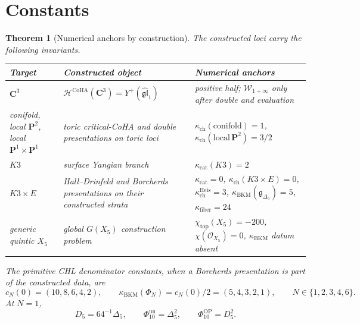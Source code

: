 \documentclass[11pt]{amsart}
\newtheorem{theorem}{Theorem}
\theoremstyle{definition}
\providecommand{\kch}{\kappa_{\mathrm{ch}}}
\providecommand{\kcat}{\kappa_{\mathrm{cat}}}
\providecommand{\kBKM}{\kappa_{\mathrm{BKM}}}
\providecommand{\kfib}{\kappa_{\mathrm{fiber}}}
\providecommand{\CoHA}{\mathcal{H}^{\mathrm{CoHA}}}
\providecommand{\fg}{\mathfrak{g}}
\providecommand{\cO}{\mathcal{O}}
\providecommand{\bC}{\mathbf{C}}
\providecommand{\bP}{\mathbf{P}}
\begin{document}
\section{Constants}

\begin{theorem}[Numerical anchors by construction]
\label{thm:generic-GX-numerical-anchors}
The constructed loci carry the following invariants.
\begin{center}
\renewcommand{\arraystretch}{1.18}
\begin{tabular}{p{}p{}p{}}
\hline
Target & Constructed object & Numerical anchors \\
\hline
\(\bC^3\) &
\(\CoHA(\bC^3)=Y^+(\widehat{\mathfrak{gl}}_1)\) &
positive half; \(\mathcal W_{1+\infty}\) only after double and evaluation \\
conifold, local \(\bP^2\), local \(\bP^1\times\bP^1\) &
toric critical-CoHA and double presentations on toric loci &
\(\kch(\mathrm{conifold})=1\),
\(\kch(\mathrm{local}\,\bP^2)=3/2\) \\
\(K3\) &
surface Yangian branch &
\(\kcat(K3)=2\) \\
\(K3\times E\) &
Hall--Drinfeld and Borcherds presentations on their constructed strata &
\(\kcat=0\),
\(\kch(K3\times E)=0\),
\(\kappa_{\mathrm{ch}}^{\mathrm{Heis}}=3\),
\(\kBKM(\fg_{\Delta_5})=5\),
\(\kfib=24\) \\
generic quintic \(X_5\) &
global \(G(X_5)\) construction problem &
\(\chi_{\mathrm{top}}(X_5)=-200\),
\(\chi(\cO_{X_5})=0\),
\(\kBKM\) datum absent \\
\hline
\end{tabular}
\end{center}
The primitive CHL denominator constants, when a Borcherds presentation
is part of the constructed data, are
\[
  c_N(0)=(10,8,6,4,2),\qquad
  \kBKM(\Phi_N)=c_N(0)/2=(5,4,3,2,1),
  \qquad
  N\in\{1,2,3,4,6\}.
\]
At \(N=1\),
\[
  D_5=64^{-1}\Delta_5,\qquad
  \Phi_{10}^{\mathrm{un}}=\Delta_5^2,\qquad
  \Phi_{10}^{\mathrm{OP}}=D_5^2.
\]
\end{theorem}
\end{document}
